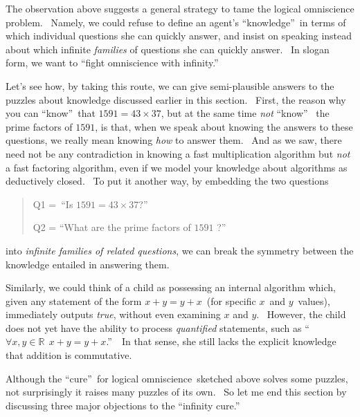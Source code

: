\documentclass[12pt,onecolumn]{article}%
\begin{document}
The observation above suggests a general strategy to tame the logical
omniscience problem. \ Namely, we could refuse to define an agent's
\textquotedblleft knowledge\textquotedblright\ in terms of which individual
questions she can quickly answer, and insist on speaking instead about which
infinite \textit{families} of questions she can quickly answer. \ In slogan
form, we want to \textquotedblleft fight omniscience with
infinity.\textquotedblright

Let's see how, by taking this route, we can give semi-plausible answers to the
puzzles about knowledge discussed earlier in this section. \ First, the reason
why you can \textquotedblleft know\textquotedblright\ that $1591=43\times37$,
but at the same time \textit{not} \textquotedblleft know\textquotedblright%
\ the prime factors of $1591$, is that, when we speak about knowing the
answers to these questions, we really mean knowing \textit{how} to answer
them. \ And as we saw, there need not be any contradiction in knowing a fast
multiplication algorithm but \textit{not} a fast factoring algorithm, even if
we model your knowledge about algorithms as deductively closed. \ To put it
another way, by embedding the two questions

\begin{quotation}
\noindent Q1 =~\textquotedblleft Is $1591=43\times37$?\textquotedblright

\noindent Q2 = \textquotedblleft What are the prime factors of $1591$%
?\textquotedblright
\end{quotation}

\noindent into \textit{infinite families of related questions}, we can break
the symmetry between the knowledge entailed in answering them.

Similarly, we could think of a child as possessing an internal algorithm
which, given any statement of the form $x+y=y+x$\ (for specific $x$\ and
$y$\ values), immediately outputs \textit{true}, without even examining $x$
and $y$. \ However, the child does not yet have the ability to process
\textit{quantified} statements, such as \textquotedblleft$\forall
x,y\in\mathbb{R}~~x+y=y+x$.\textquotedblright\ \ In that sense, she still
lacks the explicit knowledge that addition is commutative.

Although the \textquotedblleft cure\textquotedblright\ for logical
omniscience\ sketched above solves some puzzles, not surprisingly it raises
many puzzles of its own. \ So let me end this section by discussing three
major objections to the \textquotedblleft infinity cure.\textquotedblright
\end{document}

